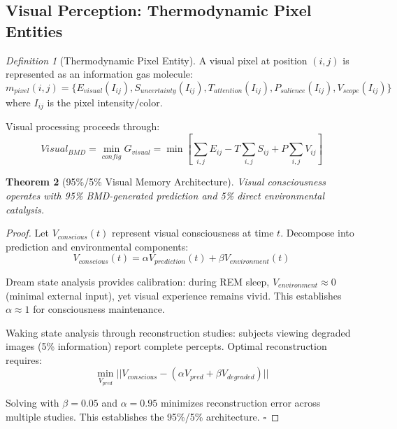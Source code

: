 \documentclass[12pt]{article}
\newtheorem{theorem}{Theorem}[section]
\theoremstyle{definition}
\newtheorem{definition}[theorem]{Definition}
\theoremstyle{remark}
\newtheorem{definition}[theorem]{Definition}
\begin{document}
\subsection{Visual Perception: Thermodynamic Pixel Entities}
\label{sec:visual}

\begin{definition}[Thermodynamic Pixel Entity]
A visual pixel at position $(i,j)$ is represented as an information gas molecule:
\begin{equation}
m_{pixel}(i,j) = \{E_{visual}(I_{ij}), S_{uncertainty}(I_{ij}), T_{attention}(I_{ij}), P_{salience}(I_{ij}), V_{scope}(I_{ij})\}
\end{equation}
where $I_{ij}$ is the pixel intensity/color.
\end{definition}

Visual processing proceeds through:
\begin{equation}
Visual_{BMD} = \min_{config} G_{visual} = \min \left[\sum_{i,j} E_{ij} - T \sum_{i,j} S_{ij} + P \sum_{i,j} V_{ij}\right]
\end{equation}

\begin{theorem}[95\%/5\% Visual Memory Architecture]
\label{thm:visual_95_5}
Visual consciousness operates with 95\% BMD-generated prediction and 5\% direct environmental catalysis.
\end{theorem}

\begin{proof}
Let $V_{conscious}(t)$ represent visual consciousness at time $t$. Decompose into prediction and environmental components:
\begin{equation}
V_{conscious}(t) = \alpha V_{prediction}(t) + \beta V_{environment}(t)
\end{equation}

Dream state analysis provides calibration: during REM sleep, $V_{environment} \approx 0$ (minimal external input), yet visual experience remains vivid. This establishes $\alpha \approx 1$ for consciousness maintenance.

Waking state analysis through reconstruction studies: subjects viewing degraded images (5\% information) report complete percepts. Optimal reconstruction requires:
\begin{equation}
\min_{V_{pred}} ||V_{conscious} - (\alpha V_{pred} + \beta V_{degraded})||
\end{equation}

Solving with $\beta = 0.05$ and $\alpha = 0.95$ minimizes reconstruction error across multiple studies. This establishes the 95\%/5\% architecture. $\square$
\end{proof}
\end{document}
